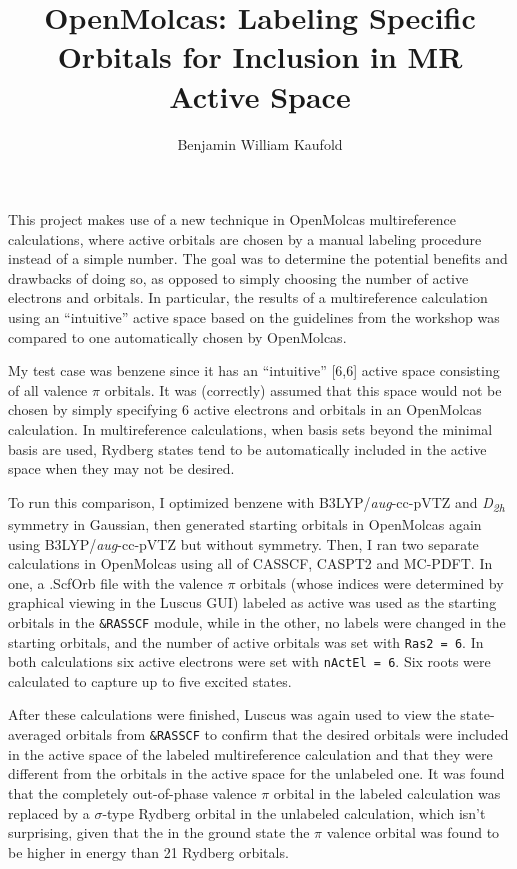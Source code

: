 \documentclass[12pt,letterpaper]{article}
\author{Benjamin William Kaufold}
\title{OpenMolcas: Labeling Specific Orbitals for Inclusion in MR Active Space}
\begin{document}
	\maketitle
	This project makes use of a new technique in OpenMolcas multireference calculations, where active orbitals are chosen by a manual labeling procedure instead of a simple number.  The goal was to determine the potential benefits and drawbacks of doing so, as opposed to simply choosing the number of active electrons and orbitals.  In particular, the results of a multireference calculation using an ``intuitive'' active space based on the guidelines from the workshop was compared to one automatically chosen by OpenMolcas.
	
	My test case was benzene since it has an ``intuitive'' [6,6] active space consisting of all valence $\pi$ orbitals.  It was (correctly) assumed that this space would not be chosen by simply specifying 6 active electrons and orbitals in an OpenMolcas calculation.  In multireference calculations, when basis sets beyond the minimal basis are used, Rydberg states tend to be automatically included in the active space when they may not be desired.
	
	To run this comparison, I optimized benzene with B3LYP/\textit{aug}-cc-pVTZ and  \textit{D\textsubscript{2h}} symmetry in Gaussian, then generated starting orbitals in OpenMolcas again using B3LYP/\textit{aug}-cc-pVTZ but without symmetry.  Then, I ran two separate calculations in OpenMolcas using all of CASSCF, CASPT2 and MC-PDFT.  In one, a .ScfOrb file with the valence $\pi$ orbitals (whose indices were determined by graphical viewing in the Luscus GUI) labeled as active was used as the starting orbitals in the {\tt \&RASSCF} module, while in the other, no labels were changed in the starting orbitals, and the number of active orbitals was set with {\tt Ras2 = 6}.  In both calculations six active electrons were set with {\tt nActEl = 6}.  Six roots were calculated to capture up to five excited states.
	
	After these calculations were finished, Luscus was again used to view the state-averaged orbitals from {\tt \&RASSCF} to confirm that the desired orbitals were included in the active space of the labeled multireference calculation and that they were different from the orbitals in the active space for the unlabeled one.  It was found that the completely out-of-phase valence $\pi$ orbital in the labeled calculation was replaced by a $\sigma$-type Rydberg orbital in the unlabeled calculation, which isn't surprising, given that the in the ground state the $\pi$ valence orbital was found to be higher in energy than 21 Rydberg orbitals.
	
\end{document}
